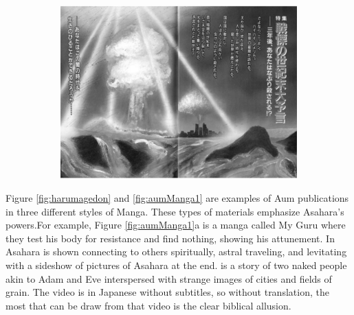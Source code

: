 \documentclass[12pt, letterpaper]{article}
\newcommand{\poses}[1]{#1's}
\begin{document}
\begin{figure}[h!]
  \caption{Harumagedon}
  \label{fig:harumagedon}
  \centering
  \begin{subfigure}[b]{.9\linewidth}
    \includegraphics[width=\linewidth]{harumagedon.png}
  \end{subfigure}
\end{figure}
\newpage{}
Figure \ref{fig:harumagedon} and \ref{fig:aumManga1} are examples of Aum publications in three different
styles of Manga. These types of materials emphasize \poses{Asahara} powers.For example, Figure
\ref{fig:aumManga1}a is a manga called My Guru where they test his body for resistance and find nothing,
showing his attunement. In  Asahara is shown connecting to others spiritually,
astral traveling, and levitating with a sideshow of pictures of Asahara at the end.
 is a story of two naked people akin to Adam and Eve interspersed with
strange images of cities and fields of grain. The video is in Japanese without subtitles, so without
translation, the most that can be draw from that video is the clear biblical allusion.
\end{document}

